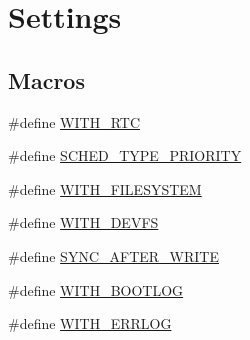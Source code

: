 \hypertarget{group___settings}{\section{Settings}
\label{group___settings}
}
\subsection*{Macros}
\begin{DoxyCompactItemize}
\item 
\#define \hyperlink{group___settings_ga1e2c27233bcd524c01ea5fcb45a002ab}{W\-I\-T\-H\-\_\-\-R\-T\-C}
\item 
\#define \hyperlink{group___settings_ga2acdc2f0df96cf6cbc35f7fd78ddb70d}{S\-C\-H\-E\-D\-\_\-\-T\-Y\-P\-E\-\_\-\-P\-R\-I\-O\-R\-I\-T\-Y}
\item 
\#define \hyperlink{group___settings_ga35c68f7b13770080cccce5baafc24a30}{W\-I\-T\-H\-\_\-\-F\-I\-L\-E\-S\-Y\-S\-T\-E\-M}
\item 
\#define \hyperlink{group___settings_gaf64dde14bdcb62760cbffd5a0b050fb5}{W\-I\-T\-H\-\_\-\-D\-E\-V\-F\-S}
\item 
\#define \hyperlink{group___settings_ga7f95cdeac372c6633422b100d6b15bba}{S\-Y\-N\-C\-\_\-\-A\-F\-T\-E\-R\-\_\-\-W\-R\-I\-T\-E}
\item 
\#define \hyperlink{group___settings_ga2c6b4dab3da5b7b77fef128e1cd2fa79}{W\-I\-T\-H\-\_\-\-B\-O\-O\-T\-L\-O\-G}
\item 
\#define \hyperlink{group___settings_ga77cf94725c645792e686ff791e47d703}{W\-I\-T\-H\-\_\-\-E\-R\-R\-L\-O\-G}
\end{DoxyCompactItemize}
